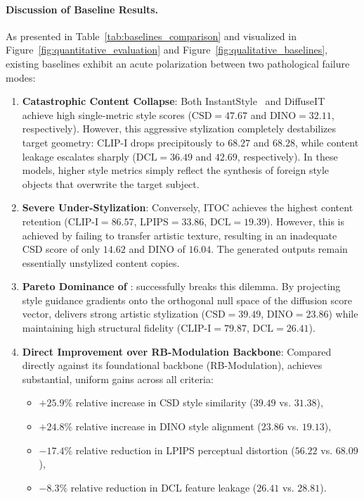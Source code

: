 \paragraph{Discussion of Baseline Results.}
As presented in Table~\ref{tab:baselines_comparison} and visualized in Figure~\ref{fig:quantitative_evaluation} and Figure~\ref{fig:qualitative_baselines}, existing baselines exhibit an acute polarization between two pathological failure modes:
\begin{enumerate}
    \item \textbf{Catastrophic Content Collapse}: Both InstantStyle~\cite{instantstyle} and DiffuseIT~\cite{diffuseIT} achieve high single-metric style scores ($\text{CSD} = 47.67$ and $\text{DINO} = 32.11$, respectively). However, this aggressive stylization completely destabilizes target geometry: CLIP-I drops precipitously to $68.27$ and $68.28$, while content leakage escalates sharply ($\text{DCL} = 36.49$ and $42.69$, respectively). In these models, higher style metrics simply reflect the synthesis of foreign style objects that overwrite the target subject.
    \item \textbf{Severe Under-Stylization}: Conversely, ITOC achieves the highest content retention ($\text{CLIP-I} = 86.57$, $\text{LPIPS} = 33.86$, $\text{DCL} = 19.39$). However, this is achieved by failing to transfer artistic texture, resulting in an inadequate CSD score of only $14.62$ and DINO of $16.04$. The generated outputs remain essentially unstylized content copies.
    \item \textbf{Pareto Dominance of \method}: \method successfully breaks this dilemma. By projecting style guidance gradients onto the orthogonal null space of the diffusion score vector, \method delivers strong artistic stylization ($\text{CSD} = 39.49$, $\text{DINO} = 23.86$) while maintaining high structural fidelity ($\text{CLIP-I} = 79.87$, $\text{DCL} = 26.41$).
    \item \textbf{Direct Improvement over RB-Modulation Backbone}: Compared directly against its foundational backbone (RB-Modulation), \method achieves substantial, uniform gains across all criteria:
    \begin{itemize}
        \item $+25.9\%$ relative increase in CSD style similarity ($39.49$ vs. $31.38$),
        \item $+24.8\%$ relative increase in DINO style alignment ($23.86$ vs. $19.13$),
        \item $-17.4\%$ relative reduction in LPIPS perceptual distortion ($56.22$ vs. $68.09$),
        \item $-8.3\%$ relative reduction in DCL feature leakage ($26.41$ vs. $28.81$).
    \end{itemize}
\end{enumerate}

